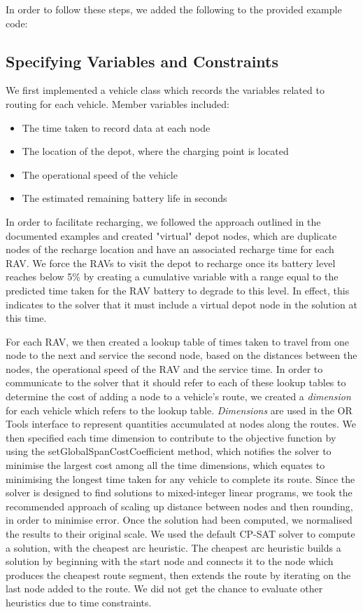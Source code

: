 In order to follow these steps, we added the following to the provided example code:

\subsection{Specifying Variables and Constraints}
We first implemented a vehicle class which records the variables related to routing for each vehicle. Member variables included:
\begin{itemize}
    \item The time taken to record data at each node
    \item The location of the depot, where the charging point is located
    \item The operational speed of the vehicle
    \item The estimated remaining battery life in seconds
\end{itemize}
In order to facilitate recharging, we followed the approach outlined in the documented examples and created "virtual" depot nodes, which are duplicate nodes of the recharge location and have an associated recharge time for each RAV.  We force the RAVs to visit the depot to recharge once its battery level reaches below 5\% by creating a cumulative variable with a range equal to the predicted time taken for the RAV battery to degrade to this level. In effect, this indicates to the solver that it must include a virtual depot node in the solution at this time.

For each RAV, we then created a lookup table of times taken to travel from one node to the next and service the second node, based on the distances between the nodes, the operational speed of the RAV and the service time. In order to communicate to the solver that it should refer to each of these lookup tables to determine the cost of adding a node to a vehicle's route, we created a \textit{dimension} for each vehicle which refers to the lookup table. \textit{Dimensions} are used in the OR Tools interface to represent quantities accumulated at nodes along the routes. We then specified each time dimension to contribute to the objective function by using the setGlobalSpanCostCoefficient method, which notifies the solver to minimise the largest cost among all the time dimensions, which equates to minimising the longest time taken for any vehicle to complete its route. Since the solver is designed to find solutions to mixed-integer linear programs, we took the recommended approach of scaling up distance between nodes and then rounding, in order to minimise error. Once the solution had been computed, we normalised the results to their original scale. We used the default CP-SAT solver to compute a solution, with the cheapest arc heuristic. The cheapest arc heuristic builds a solution by beginning with the start node and connects it to the node which produces the cheapest route segment, then extends the route by iterating on the last node added to the route. We did not get the chance to evaluate other heuristics due to time constraints.

